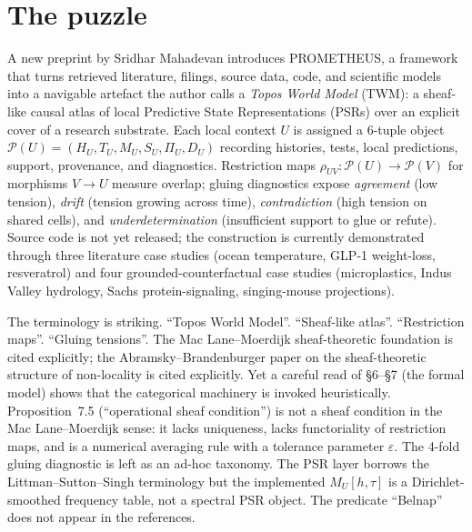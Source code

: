 \documentclass{pantarhei-researchnote}
\begin{document}
\section{The puzzle}
\label{sec:puzzle}

A new preprint by Sridhar Mahadevan \cite{Mahadevan-PROMETHEUS-2026}
introduces PROMETHEUS, a framework that turns retrieved literature,
filings, source data, code, and scientific models into a navigable
artefact the author calls a \emph{Topos World Model} (TWM): a
sheaf-like causal atlas of local Predictive State Representations
(PSRs) over an explicit cover of a research substrate. Each local
context $U$ is assigned a 6-tuple object $\mathcal{P}(U) = (H_{U},
T_{U}, M_{U}, S_{U}, \Pi_{U}, D_{U})$ recording histories, tests,
local predictions, support, provenance, and diagnostics. Restriction
maps $\rho_{UV} : \mathcal{P}(U) \to \mathcal{P}(V)$ for morphisms
$V \to U$ measure overlap; gluing diagnostics expose
\emph{agreement} (low tension), \emph{drift} (tension growing across
time), \emph{contradiction} (high tension on shared cells), and
\emph{underdetermination} (insufficient support to glue or refute).
Source code is not yet released; the construction is currently
demonstrated through three literature case studies (ocean
temperature, GLP-1 weight-loss, resveratrol) and four
grounded-counterfactual case studies (microplastics, Indus Valley
hydrology, Sachs protein-signaling, singing-mouse projections).

The terminology is striking. ``Topos World Model''. ``Sheaf-like
atlas''. ``Restriction maps''. ``Gluing tensions''. The Mac
Lane--Moerdijk \cite{MacLane-Moerdijk-1992} sheaf-theoretic
foundation is cited explicitly; the Abramsky--Brandenburger
\cite{Abramsky-Brandenburger-2011} paper on the sheaf-theoretic
structure of non-locality is cited explicitly. Yet a careful read
of §6--§7 (the formal model) shows that the categorical machinery is
invoked heuristically. Proposition~7.5 (``operational sheaf
condition'') is not a sheaf condition in the Mac Lane--Moerdijk
sense: it lacks uniqueness, lacks functoriality of restriction maps,
and is a numerical averaging rule with a tolerance parameter
$\varepsilon$. The 4-fold gluing diagnostic is left as an ad-hoc
taxonomy. The PSR layer borrows the Littman--Sutton--Singh
\cite{Littman-Sutton-Singh-2001} terminology but the implemented
$M_{U}[h, \tau]$ is a Dirichlet-smoothed frequency table, not a
spectral PSR object. The predicate ``Belnap''
\cite{Belnap-1977,Dunn-1976} does not appear in the references.
\end{document}
